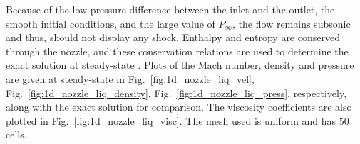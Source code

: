 \documentclass[preprint,10pt]{elsarticle}
\newcommand{\fig}[1]{Fig.~\ref{#1}}                      %
\begin{document}
Because of the low pressure difference between the inlet and the outlet, the smooth initial conditions, and the large value of $P_\infty$, the flow remains subsonic and thus, should not display any shock. Enthalpy and entropy are conserved through the nozzle, and these conservation relations are used to determine the exact solution at steady-state \cite{nozzle_exact}.
Plots of the Mach number, density and pressure are given at steady-state in \fig{fig:1d_nozzle_liq_vel}, \fig{fig:1d_nozzle_liq_density}, \fig{fig:1d_nozzle_liq_press}, respectively, along with the exact solution for comparison. The viscosity coefficients are also plotted in \fig{fig:1d_nozzle_liq_visc}. The mesh used is uniform and has $50$ cells.
\end{document}
